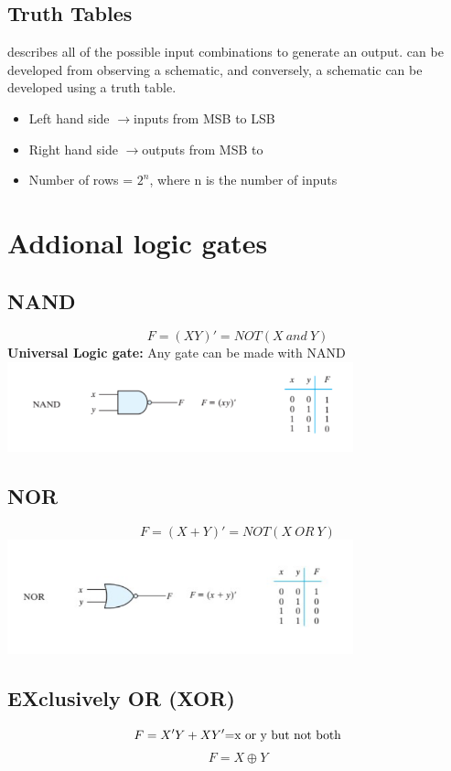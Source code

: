 \documentclass[a4paper,12pt]{article}
\newcommand{\ra}{$\rightarrow$}
\begin{document}
            \subsection*{Truth Tables}
            describes all of the possible input combinations to generate an output. can be developed from observing a schematic, and conversely, a schematic can be developed using a truth table.
            \begin{itemize}
                \item Left hand side \ra inputs from MSB to LSB
                \item Right hand side \ra outputs from MSB to
                \item Number of rows = $2^n$, where n is the number of inputs
            \end{itemize}
            
            \section{Addional logic gates}
                \subsection*{NAND}
                    \[F=(XY)'=NOT(X~and~Y)\]
                    \textbf{Universal Logic gate:} Any gate can be made with NAND
                    \vspace{10pt}\\
                    \includegraphics*[width=10cm]{NAND.png}
                    
                \subsection*{NOR}
                \[F=(X+Y)'=NOT(X~OR~Y)\]
                \includegraphics*[width=10cm]{NOR.png}

                \subsection*{EXclusively OR (XOR)}
                    \[F=X'Y+XY'\textnormal{=x or y but not both}\] \[F=X\oplus  Y\]
\end{document}

